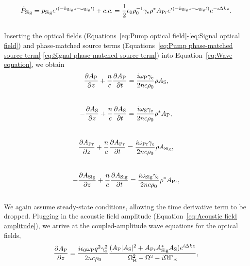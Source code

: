 \\
\begin{equation}
    \tilde{P}_{\rm Sig} = p_{\rm Sig}e^{i(-k_{\rm Sig}z - \omega_{\rm Sig} t)} + c.c. = \frac{1}{2}\epsilon_{0}\rho_{0}^{-1}\gamma_{\rm e}\rho^{*} A_{\rm Pr}e^{i(-k_{\rm Sig}z - \omega_{\rm Sig} t)}e^{-i\Delta kz}.
    \label{eq:Signal phase-matched source term}
\end{equation}
\\
Inserting the optical fields (Equations~\ref{eq:Pump optical field}-\ref{eq:Signal optical field}) and phase-matched source terms (Equations~\ref{eq:Pump phase-matched source term}-\ref{eq:Signal phase-matched source term}) into Equation~\ref{eq:Wave equation}, we obtain
\\
\begin{equation}
    \frac{\partial A_{\rm P}}{\partial z} + \frac{n}{c}\frac{\partial A_{\rm P}}{\partial t} = \frac{i\omega_{\rm P}\gamma_{\rm e}}{2nc\rho_{0}}\rho A_{\rm S},
\end{equation}
\\
\begin{equation}
    -\frac{\partial A_{\rm S}}{\partial z} + \frac{n}{c}\frac{\partial A_{\rm S}}{\partial t} = \frac{i\omega_{\rm S}\gamma_{\rm e}}{2nc\rho_{0}}\rho^{*}A_{\rm P},
\end{equation}
\\
\begin{equation}
    \frac{\partial A_{\rm Pr}}{\partial z} + \frac{n}{c}\frac{\partial A_{\rm Pr}}{\partial t} = \frac{i\omega_{\rm Pr}\gamma_{\rm e}}{2nc\rho_{0}}\rho A_{\rm Sig},
\end{equation}
\\
\begin{equation}
    -\frac{\partial A_{\rm Sig}}{\partial z} + \frac{n}{c}\frac{\partial A_{\rm Sig}}{\partial t} = \frac{i\omega_{\rm Sig}\gamma_{\rm e}}{2nc\rho_{0}}\rho^{*}A_{\rm Pr},
\end{equation}
\\
We again assume steady-state conditions, allowing the time derivative term to be dropped. Plugging in the acoustic field amplitude (Equation~\ref{eq:Acoustic field amplitude}), we arrive at the coupled-amplitude wave equations for the optical fields,
\\
\begin{equation}
    \frac{\partial A_{\rm P}}{\partial z} = \frac{i\epsilon_{0}\omega_{\rm P} q^{2}\gamma_{\rm e}^{2}}{2nc\rho_{0}}\frac{(A_{\rm P}|A_{\rm S}|^{2} + A_{\rm Pr}A_{\rm Sig}^{*}A_{\rm S})e^{i\Delta kz}}{\Omega_{\rm B}^{2} - \Omega^{2} - i\Omega\Gamma_{\rm B}},
    \label{eq:Pump coupled-amplitude wave equation}
\end{equation}
